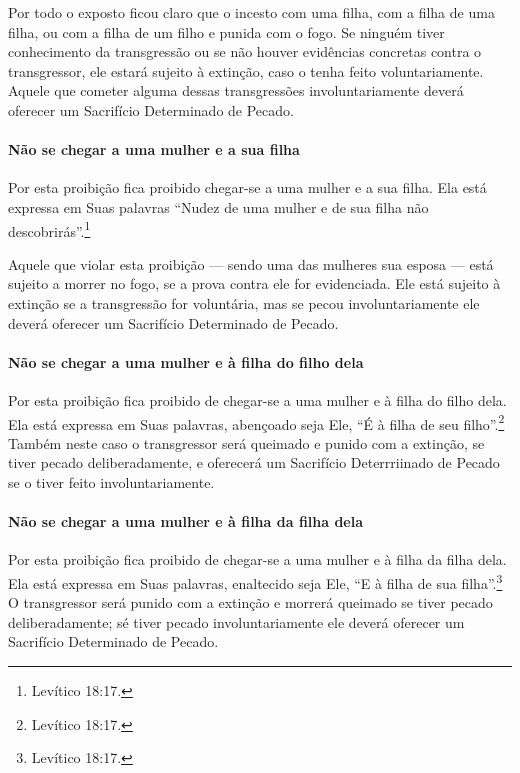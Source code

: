 Por todo o exposto ficou claro que o incesto com uma filha, com a filha de uma filha, ou com a filha de um filho e punida com o fogo. Se
ninguém tiver conhecimento da transgressão ou se não houver evidências
concretas contra o transgressor, ele estará sujeito à extinção, caso o
tenha feito voluntariamente. Aquele que cometer alguma dessas
transgressões involuntariamente deverá oferecer um Sacrifício
Determinado de Pecado.

\paragraph{Não se chegar a uma mulher e a sua filha}

Por esta proibição fica proibido chegar-se a uma mulher e a sua filha.
Ela está expressa em Suas palavras ``Nudez de uma mulher e de sua filha
não descobrirás''.\footnote{Levítico 18:17.}

Aquele que violar esta proibição --- sendo uma das mulheres sua esposa
--- está sujeito a morrer no fogo, se a prova contra ele for
evidenciada. Ele está sujeito à extinção se a transgressão for
voluntária, mas se pecou involuntariamente ele deverá oferecer um
Sacrifício Determinado de Pecado.

\paragraph{Não se chegar a uma mulher e à filha do filho dela}

Por esta proibição fica proibido de chegar-se a uma mulher e à filha do
filho dela. Ela está expressa em Suas palavras, abençoado seja Ele, ``É à
filha de seu filho''.\footnote{Levítico 18:17.} Também neste caso o transgressor
será queimado e punido com a extinção, se tiver pecado deliberadamente,
e oferecerá um Sacrifício Deterrriinado de Pecado se o tiver feito
involuntariamente.

\paragraph{Não se chegar a uma mulher e à filha da filha dela}

Por esta proibição fica proibido de chegar-se a uma mulher e à filha da
filha dela. Ela está expressa em Suas palavras, enaltecido seja Ele, ``E
à filha de sua filha''.\footnote{Levítico 18:17.} O transgressor será punido com
a extinção e morrerá queimado se tiver pecado deliberadamente; sé tiver
pecado involuntariamente ele deverá oferecer um Sacrifício Determinado
de Pecado.

